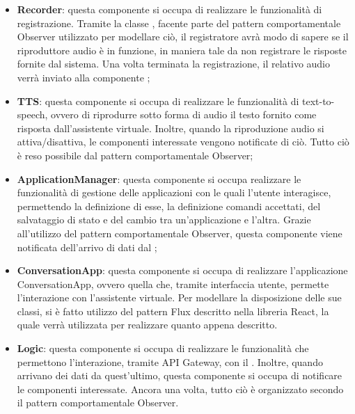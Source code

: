 \begin{itemize}
	\item \textbf{Recorder}: questa componente si occupa di realizzare le funzionalità di registrazione. Tramite la classe , facente parte del pattern comportamentale Observer utilizzato per modellare ciò, il registratore avrà modo di sapere se il riproduttore audio è in funzione, in maniera tale da non registrare le risposte fornite dal sistema. Una volta terminata la registrazione, il relativo audio verrà inviato alla componente ;
	\item \textbf{TTS}: questa componente si occupa di realizzare le funzionalità di text-to-speech, ovvero di riprodurre sotto forma di audio il testo fornito come risposta dall'assistente virtuale. Inoltre, quando la riproduzione audio si attiva/disattiva, le componenti interessate vengono notificate di ciò. Tutto ciò è reso possibile dal pattern comportamentale Observer;
	\item \textbf{ApplicationManager}: questa componente si occupa realizzare le funzionalità di gestione delle applicazioni con le quali l'utente interagisce, permettendo la definizione di esse, la definizione comandi accettati, del salvataggio di stato e del cambio tra un'applicazione e l'altra. Grazie all'utilizzo del pattern comportamentale Observer, questa componente viene notificata dell'arrivo di dati dal ;
	\item \textbf{ConversationApp}: questa componente si occupa di realizzare l'applicazione ConversationApp, ovvero quella che, tramite interfaccia utente, permette l'interazione con l'assistente virtuale. Per modellare la disposizione delle sue classi, si è fatto utilizzo del pattern Flux descritto nella libreria React, la quale verrà utilizzata per realizzare quanto appena descritto.
	\item \textbf{Logic}: questa componente si occupa di realizzare le funzionalità che permettono l'interazione, tramite API Gateway, con il . Inoltre, quando arrivano dei dati da quest'ultimo, questa componente si occupa di notificare le componenti interessate. Ancora una volta, tutto ciò è organizzato secondo il pattern comportamentale Observer.
\end{itemize}
